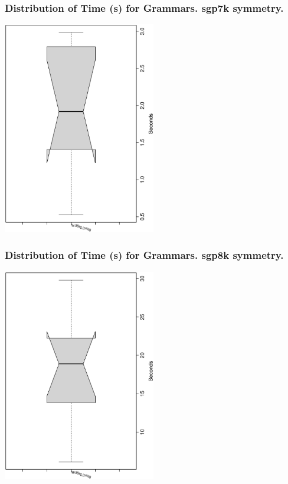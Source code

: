 \documentclass[18pt,c]{beamer}
\begin{document}
 \begin{frame}
 \frametitle{ Distribution of Time (s) for Grammars. sgp7k  symmetry. }
 \begin{center}
\includegraphics[width=0.5\textwidth, angle=-90]
{ExpFboxplottSeconds005.eps}
 \end{center}
 \label{ExpFboxplottSeconds005.eps}  
 \end{frame}

 \begin{frame}
 \frametitle{ Distribution of Time (s) for Grammars. sgp8k  symmetry. }
 \begin{center}
\includegraphics[width=0.5\textwidth, angle=-90]
{ExpFboxplottSeconds006.eps}
 \end{center}
 \label{ExpFboxplottSeconds006.eps}  
 \end{frame}
\end{document}
